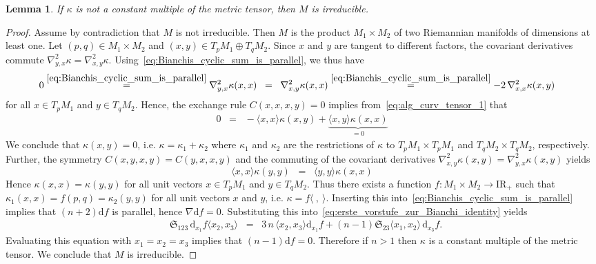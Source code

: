 \documentclass[11pt,a4paper]{article}
\theoremstyle{plain}
\newtheorem{lemma}{Lemma}
\theoremstyle{remark}
\newcommand{\cyclic}{\mathfrak{S}}
\newcommand{\R}{\mathrm{I\!R}}
\renewcommand{\d}{\mathrm{d}}
\begin{document}
\bigskip
\begin{lemma}\label{le:M_is_irreducible}
If $\kappa$ is not a constant multiple of the metric tensor, then $M$ is irreducible.
\end{lemma}
\begin{proof}
Assume by contradiction that $M$ is not irreducible. Then $M$ is the product $M_1 \times M_2$ of two Riemannian manifolds of dimensions at least one.
Let $(p,q)\in M_1 \times M_2$ and $(x,y)\in T_pM_1\oplus T_qM_2$. 
Since $x$ and $y$ are tangent to different factors, the covariant derivatives commute $\nabla^2_{y,x}\kappa  =  \nabla^2_{x,y}\kappa$. Using~\eqref{eq:Bianchis_cyclic_sum_is_parallel}, we thus have
\begin{align*}
0 &\stackrel{\eqref{eq:Bianchis_cyclic_sum_is_parallel}}{=} \nabla^2_{y,x}\kappa(x,x)\;\;=\;\; \nabla^2_{x,y}\kappa(x,x)\stackrel{\eqref{eq:Bianchis_cyclic_sum_is_parallel}}{=} - 2\,\nabla^2_{x,x}\kappa(x,y)
\end{align*}
for all $x\in T_pM_1$ and $y\in T_qM_2$. Hence, the exchange rule $C(x,x,x,y) = 0$ implies from~\eqref{eq:alg_curv_tensor_1} that
\begin{align*}
0 \;\;=\;\; - \langle x, x\rangle \kappa (x,y) + \underbrace{\langle x, y\rangle \kappa (x,x)}_{=0}
\end{align*}
We conclude that $ \kappa (x,y) = 0$, i.e. $\kappa = \kappa_1 + \kappa_2$ where $\kappa_1$ and $\kappa_2$ are the restrictions of 
$\kappa$ to $T_pM_1\times T_pM_1$ and $T_qM_2\times T_qM_2$, respectively. Further, the symmetry $C(x,y,x,y) = C(y,x,x,y)$ 
and the commuting of the covariant derivatives
$\nabla^2_{x,y}\kappa(x,y) = \nabla^2_{y,x}\kappa(x,y)$ yields
\begin{equation*}
\langle x, x\rangle \kappa (y,y)\;\;=\;\;\langle y, y\rangle \kappa (x,x)
\end {equation*}
Hence $\kappa(x,x) = \kappa(y,y)$ for all unit vectors $x\in T_pM_1$ and $y\in T_qM_2$. 
Thus there exists a function $f \colon M_1\times M_2 \to \R_+$  such that
$\kappa_1(x,x) = f(p,q) = \kappa_2(y,y)$ for all unit vectors $x$ and $y$, i.e. $\kappa =  f\langle\ ,\ \rangle$.  Inserting this into~\eqref{eq:Bianchis_cyclic_sum_is_parallel} implies that $(n + 2)\d f$ is parallel, hence
$\nabla \d f = 0$. Substituting this into~\eqref{eq:erste_vorstufe_zur_Bianchi_identity} yields
\begin{align*}
& \cyclic_{123}\, \d_{x_1}f \langle x_2,x_3 \rangle\;\;=\;\;3\,n\, \langle x_2,x_3\rangle \d_{x_1}f + (n-1) \cyclic_{23}\langle x_1,x_2 \rangle\, \d_{x_3}f.
\end{align*}
Evaluating this equation with $x_1 = x_2 = x_3$ implies that $(n - 1) \d f = 0$. Therefore if $n > 1$ then $\kappa$ is a constant multiple of the metric tensor. We conclude that $M$ is irreducible.
\end{proof}
\end{document}
